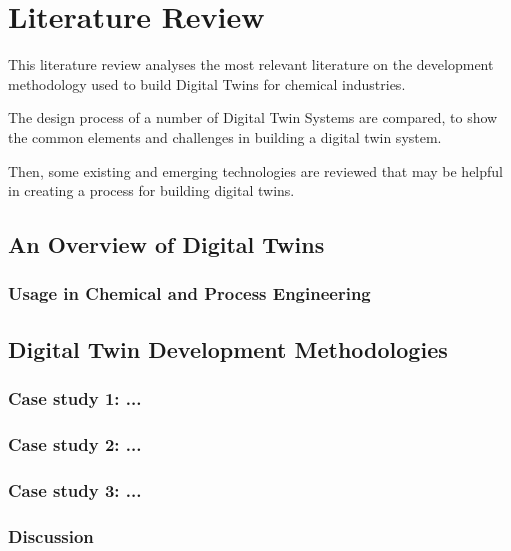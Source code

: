
\chapter{Literature Review}

This literature review analyses the most relevant literature on the development methodology used to build Digital Twins for chemical industries.

The design process of a number of Digital Twin Systems are compared, to show the common elements and challenges in building a digital twin system.

Then, some existing and emerging technologies are reviewed that may be helpful in creating a process for building digital twins.

\section{An Overview of Digital Twins}



\subsection{Usage in Chemical and Process Engineering}




\section{Digital Twin Development Methodologies}

\subsection{Case study 1: ...}

\subsection{Case study 2: ...}

\subsection{Case study 3: ...}

\subsection{Discussion}



